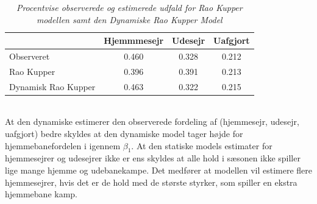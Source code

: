 \documentclass[11pt,a4paper]{article}
\begin{document}
\begin{table}[htb!]
\centering
\begin{adjustbox}{max width=\textwidth}
\begin{tabular}{|l|ccc|}
\hline 
 & Hjemmmesejr & Udesejr & Uafgjort \\
 \hline
Observeret & 0.460 & 0.328 & 0.212\\
Rao Kupper & 0.396 & 0.391 & 0.213\\
Dynamisk Rao Kupper & 0.463 & 0.322 & 0.215\\
   \hline   
\end{tabular} 
\end{adjustbox}
\caption{\label{tab:Styrkeestimater}\textit{Procentvise observerede og estimerede udfald for Rao Kupper modellen samt den Dynamiske Rao Kupper Model}}
\end{table}\\
At den dynamiske estimerer den observerede fordeling af (hjemmesejr, udesejr, uafgjort) bedre skyldes at den dynamiske model tager højde for hjemmebanefordelen i igennem $\beta_1$. At den statiske models estimater for hjemmesejrer og udesejrer ikke er ens skyldes at alle hold i sæsonen ikke spiller lige mange hjemme og udebanekampe. Det medfører at modellen vil estimere flere hjemmesejrer, hvis det er de hold med de største styrker, som spiller en ekstra hjemmebane kamp. 
\end{document}
